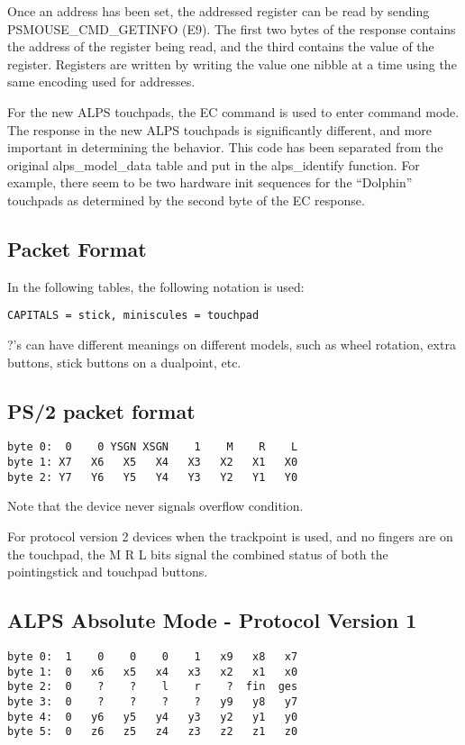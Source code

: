 \documentclass[a4paper,8pt,english]{sphinxmanual}
\begin{document}
Once an address has been set, the addressed register can be read by sending
PSMOUSE\_CMD\_GETINFO (E9). The first two bytes of the response contains the
address of the register being read, and the third contains the value of the
register. Registers are written by writing the value one nibble at a time
using the same encoding used for addresses.

For the new ALPS touchpads, the EC command is used to enter command
mode. The response in the new ALPS touchpads is significantly different,
and more important in determining the behavior.  This code has been
separated from the original alps\_model\_data table and put in the
alps\_identify function.  For example, there seem to be two hardware init
sequences for the ``Dolphin'' touchpads as determined by the second byte
of the EC response.


\subsection{Packet Format}
\label{input/devices/alps:packet-format}
In the following tables, the following notation is used:

\begin{Verbatim}[commandchars=\\\{\}]
CAPITALS = stick, miniscules = touchpad
\end{Verbatim}

?'s can have different meanings on different models, such as wheel rotation,
extra buttons, stick buttons on a dualpoint, etc.


\subsection{PS/2 packet format}
\label{input/devices/alps:ps-2-packet-format}
\begin{Verbatim}[commandchars=\\\{\}]
byte 0:  0    0 YSGN XSGN    1    M    R    L
byte 1: X7   X6   X5   X4   X3   X2   X1   X0
byte 2: Y7   Y6   Y5   Y4   Y3   Y2   Y1   Y0
\end{Verbatim}

Note that the device never signals overflow condition.

For protocol version 2 devices when the trackpoint is used, and no fingers
are on the touchpad, the M R L bits signal the combined status of both the
pointingstick and touchpad buttons.


\subsection{ALPS Absolute Mode - Protocol Version 1}
\label{input/devices/alps:alps-absolute-mode-protocol-version-1}
\begin{Verbatim}[commandchars=\\\{\}]
byte 0:  1    0    0    0    1   x9   x8   x7
byte 1:  0   x6   x5   x4   x3   x2   x1   x0
byte 2:  0    ?    ?    l    r    ?  fin  ges
byte 3:  0    ?    ?    ?    ?   y9   y8   y7
byte 4:  0   y6   y5   y4   y3   y2   y1   y0
byte 5:  0   z6   z5   z4   z3   z2   z1   z0
\end{Verbatim}
\end{document}
